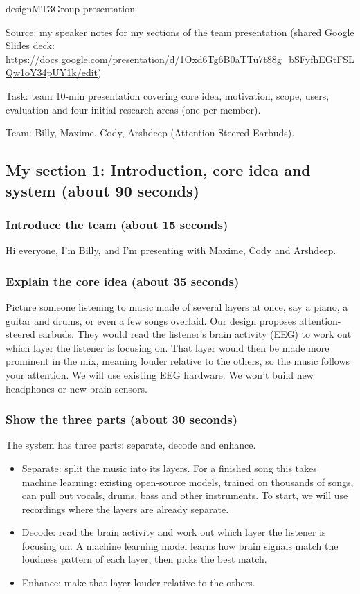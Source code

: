 \begin{entry}{design}{MT3}{Group presentation}

Source: my speaker notes for my sections of the team presentation (shared Google Slides deck: \url{https://docs.google.com/presentation/d/1Oxd6Tg6B0aTTu7t88g_bSFyfhEGtFSLQw1oY34pUY1k/edit})

Task: team 10-min presentation covering core idea, motivation, scope, users, evaluation and four initial research areas (one per member).

Team: Billy, Maxime, Cody, Arshdeep (Attention-Steered Earbuds).

\subsection*{My section 1: Introduction, core idea and system (about 90 seconds)}

\subsubsection*{Introduce the team (about 15 seconds)}
Hi everyone, I'm Billy, and I'm presenting with Maxime, Cody and Arshdeep.

\subsubsection*{Explain the core idea (about 35 seconds)}
Picture someone listening to music made of several layers at once, say a piano, a guitar and drums, or even a few songs overlaid.
Our design proposes attention-steered earbuds. They would read the listener's brain activity (EEG) to work out which layer the listener is focusing on.
That layer would then be made more prominent in the mix, meaning louder relative to the others, so the music follows your attention.
We will use existing EEG hardware. We won't build new headphones or new brain sensors.

\subsubsection*{Show the three parts (about 30 seconds)}
The system has three parts: separate, decode and enhance.
\begin{itemize}
  \item Separate: split the music into its layers. For a finished song this takes machine learning: existing open-source models, trained on thousands of songs, can pull out vocals, drums, bass and other instruments. To start, we will use recordings where the layers are already separate.
  \item Decode: read the brain activity and work out which layer the listener is focusing on. A machine learning model learns how brain signals match the loudness pattern of each layer, then picks the best match.
  \item Enhance: make that layer louder relative to the others.
\end{itemize}


\end{entry}
